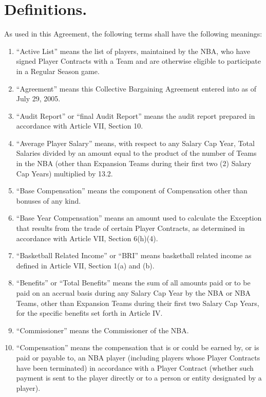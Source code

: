 \documentclass[
]{book}
\providecommand{\tightlist}{%
  \setlength{\itemsep}{0pt}\setlength{\parskip}{0pt}}
\begin{document}
\hypertarget{definitions.}{%
\section{Definitions.}\label{definitions.}}

As used in this Agreement, the following terms shall have the following meanings:

\begin{enumerate}
\def\labelenumi{\arabic{enumi}.}
\tightlist
\item
  ``Active List'' means the list of players, maintained by the NBA, who have signed Player Contracts with a Team and are otherwise eligible to participate in a Regular Season game.
\item
  ``Agreement'' means this Collective Bargaining Agreement entered into as of July 29, 2005.
\item
  ``Audit Report'' or ``final Audit Report'' means the audit report prepared in accordance with Article VII, Section 10.
\item
  ``Average Player Salary'' means, with respect to any Salary Cap Year, Total Salaries divided by an amount equal to the product of the number of Teams in the NBA (other than Expansion Teams during their first two (2) Salary Cap Years) multiplied by 13.2.
\item
  ``Base Compensation'' means the component of Compensation other than bonuses of any kind.
\item
  ``Base Year Compensation'' means an amount used to calculate the Exception that results from the trade of certain Player Contracts, as determined in accordance with Article VII, Section 6(h)(4).
\item
  ``Basketball Related Income'' or ``BRI'' means basketball related income as defined in Article VII, Section 1(a) and (b).
\item
  ``Benefits'' or ``Total Benefits'' means the sum of all amounts paid or to be paid on an accrual basis during any Salary Cap Year by the NBA or NBA Teams, other than Expansion Teams during their first two Salary Cap Years, for the specific benefits set forth in Article IV.
\item
  ``Commissioner'' means the Commissioner of the NBA.
\item
  ``Compensation'' means the compensation that is or could be earned by, or is paid or payable to, an NBA player (including players whose Player Contracts have been terminated) in accordance with a Player Contract (whether such payment is sent to the player directly or to a person or entity designated by a player).

\end{enumerate}
\end{document}
